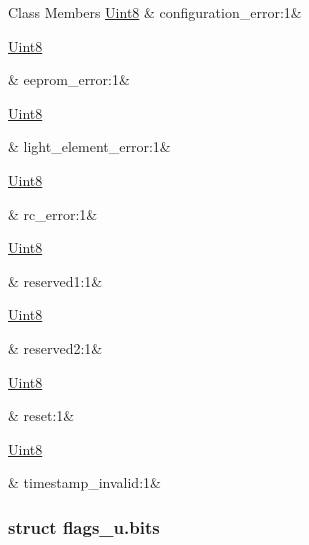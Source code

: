\begin{DoxyFields}{Class Members}
\hypertarget{a00001_a72722903b21215ab8de86947b002876f}{\hyperlink{a00001_a979e3e23b9a449e69ab6a8a83b6042f8}{Uint8}}\label{a00001_a72722903b21215ab8de86947b002876f}
&
configuration\+\_\+error\+:1&
\\
\hline

\hypertarget{a00001_abb8bebcd893d6382a6f7f0d9c32c6f5c}{\hyperlink{a00001_a979e3e23b9a449e69ab6a8a83b6042f8}{Uint8}}\label{a00001_abb8bebcd893d6382a6f7f0d9c32c6f5c}
&
eeprom\+\_\+error\+:1&
\\
\hline

\hypertarget{a00001_a5a110df9e0ba0196dec42296c3bda095}{\hyperlink{a00001_a979e3e23b9a449e69ab6a8a83b6042f8}{Uint8}}\label{a00001_a5a110df9e0ba0196dec42296c3bda095}
&
light\+\_\+element\+\_\+error\+:1&
\\
\hline

\hypertarget{a00001_a84fb411fece2061d5087478469d8c68e}{\hyperlink{a00001_a979e3e23b9a449e69ab6a8a83b6042f8}{Uint8}}\label{a00001_a84fb411fece2061d5087478469d8c68e}
&
rc\+\_\+error\+:1&
\\
\hline

\hypertarget{a00001_a02e5f0e2d4c465ad65440f54aea77390}{\hyperlink{a00001_a979e3e23b9a449e69ab6a8a83b6042f8}{Uint8}}\label{a00001_a02e5f0e2d4c465ad65440f54aea77390}
&
reserved1\+:1&
\\
\hline

\hypertarget{a00001_adee1e5203945c2132525ef0d725c02d2}{\hyperlink{a00001_a979e3e23b9a449e69ab6a8a83b6042f8}{Uint8}}\label{a00001_adee1e5203945c2132525ef0d725c02d2}
&
reserved2\+:1&
\\
\hline

\hypertarget{a00001_a86266ee937d97f812a8e57d22b62ee29}{\hyperlink{a00001_a979e3e23b9a449e69ab6a8a83b6042f8}{Uint8}}\label{a00001_a86266ee937d97f812a8e57d22b62ee29}
&
reset\+:1&
\\
\hline

\hypertarget{a00001_a3ecd364e1258b14973d222f034479a8d}{\hyperlink{a00001_a979e3e23b9a449e69ab6a8a83b6042f8}{Uint8}}\label{a00001_a3ecd364e1258b14973d222f034479a8d}
&
timestamp\+\_\+invalid\+:1&
\\
\hline

\end{DoxyFields}
\label{d9/da5/a00075}
\hypertarget{a00001_d9/da5/a00075}{}
\subsubsection{struct flags\+\_\+u.\+bits}


